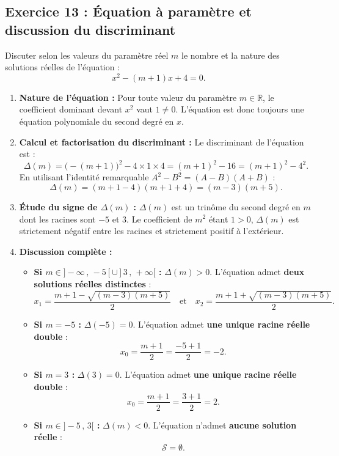 \documentclass[11pt,a4paper]{article}
\newcommand{\R}{\mathbb{R}}
\begin{document}
\subsection*{Exercice 13 : Équation à paramètre et discussion du discriminant}
Discuter selon les valeurs du paramètre réel $m$ le nombre et la nature des solutions réelles de l'équation :
\[
x^2 - (m+1)x + 4 = 0.
\]

\begin{correctionbox}
\begin{enumerate}
    \item \textbf{Nature de l'équation :}
    Pour toute valeur du paramètre $m \in \R$, le coefficient dominant devant $x^2$ vaut $1 \neq 0$. L'équation est donc toujours une équation polynomiale du second degré en $x$.

    \item \textbf{Calcul et factorisation du discriminant :}
    Le discriminant de l'équation est :
    \[
    \Delta(m) = \bigl(-(m+1)\bigr)^2 - 4 \times 1 \times 4 = (m+1)^2 - 16 = (m+1)^2 - 4^2.
    \]
    En utilisant l'identité remarquable $A^2 - B^2 = (A-B)(A+B)$ :
    \[
    \Delta(m) = (m + 1 - 4)(m + 1 + 4) = (m - 3)(m + 5).
    \]

    \item \textbf{Étude du signe de $\Delta(m)$ :}
    $\Delta(m)$ est un trinôme du second degré en $m$ dont les racines sont $-5$ et $3$. Le coefficient de $m^2$ étant $1 > 0$, $\Delta(m)$ est strictement négatif entre les racines et strictement positif à l'extérieur.

    \item \textbf{Discussion complète :}
    \begin{itemize}
        \item \textbf{Si $m \in ]-\infty\,,\, -5[ \cup ]3\,,\, +\infty[$ :}
        $\Delta(m) > 0$. L'équation admet \textbf{deux solutions réelles distinctes} :
        \[
        x_1 = \frac{m + 1 - \sqrt{(m-3)(m+5)}}{2} \quad \text{et} \quad x_2 = \frac{m + 1 + \sqrt{(m-3)(m+5)}}{2}.
        \]
        \item \textbf{Si $m = -5$ :}
        $\Delta(-5) = 0$. L'équation admet \textbf{une unique racine réelle double} :
        \[
        x_0 = \frac{m + 1}{2} = \frac{-5 + 1}{2} = -2.
        \]
        \item \textbf{Si $m = 3$ :}
        $\Delta(3) = 0$. L'équation admet \textbf{une unique racine réelle double} :
        \[
        x_0 = \frac{m + 1}{2} = \frac{3 + 1}{2} = 2.
        \]
        \item \textbf{Si $m \in ]-5\,,\, 3[$ :}
        $\Delta(m) < 0$. L'équation n'admet \textbf{aucune solution réelle} :
        \[
        \mathcal{S} = \emptyset.
        \]
    \end{itemize}
\end{enumerate}
\end{correctionbox}
\end{document}
